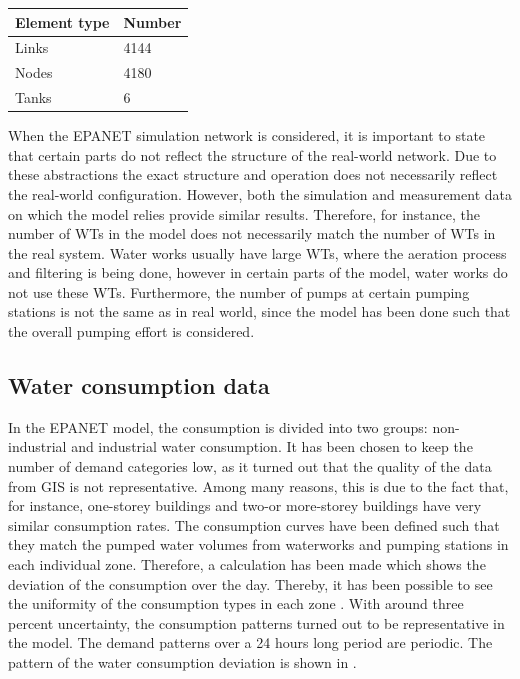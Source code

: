 \begin{center}
\label{numberofelements_table}
    \begin{tabular}{ | p{3cm} | p{3cm} |}
    \hline
    \textbf{Element type} & \textbf{Number}  \\ 
    \hline
    Links & 4144  \\ 
    \hline
    Nodes & 4180  \\ 
    \hline
    Tanks & 6  \\ 
    \hline
    \end{tabular}
\end{center}

\vspace{-3mm}

When the EPANET simulation network is considered, it is important to state that certain parts do not reflect the structure of the real-world network. Due to these abstractions the exact structure and operation does not necessarily reflect the real-world configuration. However, both the simulation and measurement data on which the model relies provide similar results. Therefore, for instance, the number of WTs in the model does not necessarily match the number of WTs in the real system. Water works usually have large WTs, where the aeration process and filtering is being done, however in certain parts of the model, water works do not use these WTs. Furthermore, the number of pumps at certain pumping stations is not the same as in real world, since the model has been done such that the overall pumping effort is considered.  

\subsection{Water consumption data}
\label{water_consumption_data}

In the EPANET model, the consumption is divided into two groups: non-industrial and industrial water consumption. It has been chosen to keep the number of demand categories low, as it turned out that the quality of the data from GIS is not representative. Among many reasons, this is due to the fact that, for instance, one-storey buildings and two-or more-storey buildings have very similar consumption rates. The consumption curves have been defined such that they match the pumped water volumes from waterworks and pumping stations in each individual zone. Therefore, a calculation has been made which shows the deviation of the consumption over the day. Thereby, it has been possible to see the uniformity of the consumption types in each zone \cite{verdo_doc}. With around three percent uncertainty, the consumption patterns turned out to be representative in the model. The demand patterns over a 24 hours long period are periodic. The pattern of the water consumption deviation is shown in  .

